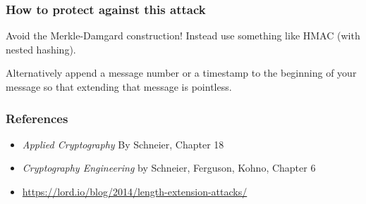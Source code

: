 \documentclass{beamer}
\newcommand{\<}{\langle}
\renewcommand{\>}{\rangle}
\begin{document}
\begin{frame}
\frametitle{How to protect against this attack}

Avoid the Merkle-Damgard construction! Instead use something like HMAC (with nested hashing). \newline

Alternatively append a message number or a timestamp to the beginning of your message so that extending that message is pointless.
\end{frame}

\begin{frame}
\frametitle{References}

\begin{itemize}
\item \emph{Applied Cryptography} By Schneier, Chapter 18
\item \emph{Cryptography Engineering} by Schneier, Ferguson, Kohno, Chapter 6
\item \url{https://lord.io/blog/2014/length-extension-attacks/}
\end{itemize}
\end{frame}
\end{document}

